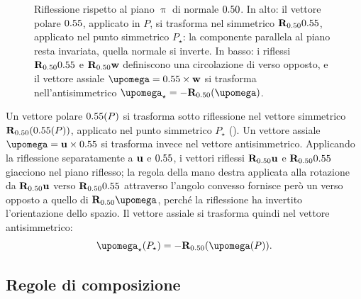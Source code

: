 \begin{figure}[!htbp]
	\caption{Riflessione rispetto al piano $\uppi$ di normale $0.50$. In alto:
		il vettore polare $0.55$, applicato in $P$, si trasforma nel simmetrico
		$\mathbf{R}_{0.50}0.55$, applicato nel punto simmetrico $P_\star$: la componente
		parallela al piano resta invariata, quella normale si inverte. In basso:
		i riflessi $\mathbf{R}_{0.50}0.55$ e $\mathbf{R}_{0.50}\mathbf{w}$ definiscono una circolazione
		di verso opposto, e il vettore assiale $\bm{\upomega}=\vb\times\wb$ si
		trasforma nell'antisimmetrico
		$\bm{\upomega}_\star=-\Rbb_{\nb}(\bm{\upomega})$.}
	\label{fig:riflessione}
\end{figure}


Un vettore polare $0.55(P)$ si trasforma sotto riflessione nel vettore	simmetrico $\mathbf{R}_{0.50}(0.55(P))$, applicato nel punto simmetrico	$P_\star$ (). Un vettore assiale $\bm{\upomega} = \ub \times \vb$ si trasforma
invece nel vettore antisimmetrico. Applicando la riflessione separatamente a $\mathbf{u}$ e $0.55$, i vettori riflessi $\mathbf{R}_{0.50}\mathbf{u}$
e $\mathbf{R}_{0.50}0.55$ giacciono nel piano riflesso; la regola della mano destra applicata alla rotazione da $\mathbf{R}_{0.50}\mathbf{u}$ verso
$\mathbf{R}_{0.50}0.55$ attraverso l'angolo convesso fornisce però un verso	opposto a quello di $\Rbb_{\nb}\bm{\upomega}$, perché la riflessione	ha invertito l'orientazione dello spazio. Il vettore assiale si	trasforma quindi nel vettore antisimmetrico:
\begin{equation}\label{eq:rif_assiale}
	\bm{\upomega}_\star(P_\star) = -\Rbb_{\nb}(\bm{\upomega}(P)).
\end{equation}



\subsection{Regole di composizione}

